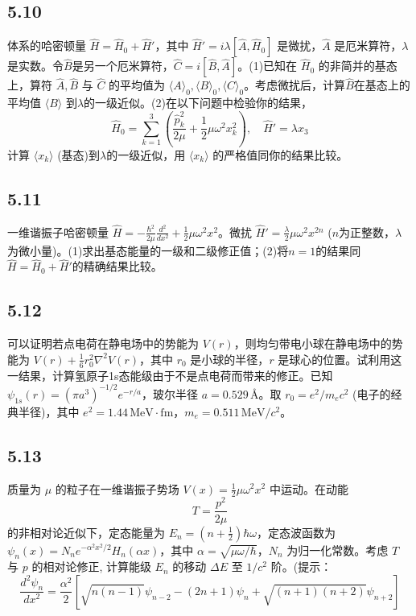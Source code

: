 \subsection{5.10}
体系的哈密顿量 $\hat{H} = \hat{H}_0 + \hat{H}'$，其中 $\hat{H}' = i \lambda [\hat{A}, \hat{H}_0]$ 是微扰，$\hat{A}$ 是厄米算符，$\lambda$是实数。令$\hat{B}$是另一个厄米算符，$\hat{C} = i[\hat{B}, \hat{A}]$。(1)已知在 $\hat{H}_0$ 的非简并的基态上，算符 $\hat{A}, \hat{B}$ 与 $\hat{C}$ 的平均值为 $\langle A \rangle_0, \langle B \rangle_0, \langle C \rangle_0$。考虑微扰后，计算$\hat{B}$在基态上的平均值 $\langle B \rangle$ 到$\lambda$的一级近似。(2)在以下问题中检验你的结果，
$$\hat{H}_0 = \sum_{k=1}^3 \left( \frac{\hat{p}_k^2}{2\mu} + \frac{1}{2}\mu \omega^2 x_k^2 \right), \quad \hat{H}' = \lambda x_3$$
计算 $\langle x_k \rangle$ (基态)到$\lambda$的一级近似，用 $\langle x_k \rangle$ 的严格值同你的结果比较。

\subsection{5.11}
一维谐振子哈密顿量 $\hat{H} = -\frac{\hbar^2}{2\mu}\frac{d^2}{dx^2} + \frac{1}{2}\mu\omega^2x^2$。微扰 $\hat{H}' = \frac{\lambda}{2}\mu\omega^2x^{2n}$ ($n$为正整数，$\lambda$为微小量)。(1)求出基态能量的一级和二级修正值；(2)将$n=1$的结果同$\hat{H} = \hat{H}_0 + \hat{H}'$的精确结果比较。

\subsection{5.12}
可以证明若点电荷在静电场中的势能为 $V(r)$，则均匀带电小球在静电场中的势能为 $V(r) + \frac{1}{6} r_0^{2} \nabla^2 V(r)$，其中 $r_0$ 是小球的半径，$r$ 是球心的位置。试利用这一结果，计算氢原子1s态能级由于不是点电荷而带来的修正。已知 $\psi_{1s}(r) = (\pi a^3)^{-1/2} e^{-r/a}$，玻尔半径 $a = 0.529 \, \text{\AA}$。取 $r_0 = e^2 / m_e c^2$ (电子的经典半径)，其中 $e^2 = 1.44 \, \text{MeV} \cdot \text{fm}$，$m_e = 0.511 \, \text{MeV}/c^2$。

\subsection{5.13}
质量为 $\mu$ 的粒子在一维谐振子势场 $V(x) = \frac{1}{2} \mu \omega^2 x^2$ 中运动。在动能
$$T = \frac{p^2}{2\mu}$$
的非相对论近似下，定态能量为 $E_n = \left( n + \frac{1}{2} \right) \hbar \omega$，定态波函数为
$\psi_n (x) = N_n e^{-\alpha^2 x^2 / 2} H_n (\alpha x)$，其中 $\alpha = \sqrt{\mu \omega / \hbar}$，$N_n$ 为归一化常数。考虑 $T$ 与 $p$ 的相对论修正, 计算能级 $E_n$ 的移动 $\Delta E$ 至 $1/c^2$ 阶。(提示：
$$\frac{d^2 \psi_n}{dx^2} = \frac{\alpha^2}{2} \left[ \sqrt{n(n-1)} \psi_{n-2} - (2n+1)\psi_n + \sqrt{(n+1)(n+2)}\psi_{n+2} \right]$$

